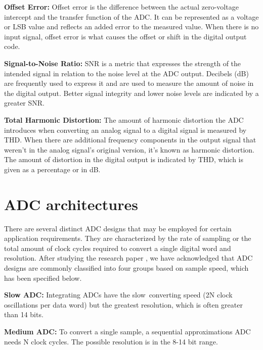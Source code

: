 \vspace{1\baselineskip}\par 
\textbf{Offset Error:} Offset error is the difference between the actual zero-voltage intercept and the transfer function of the ADC. It can be represented as a voltage or LSB value and reflects an added error to the measured value. When there is no input signal, offset error is what causes the offset or shift in the digital output code.

\vspace{1\baselineskip}\par 
\textbf{Signal-to-Noise Ratio:} SNR is a metric that expresses the strength of the intended signal in relation to the noise level at the ADC output. Decibels (dB) are frequently used to express it and are used to measure the amount of noise in the digital output. Better signal integrity and lower noise levels are indicated by a greater SNR.

\vspace{1\baselineskip}\par 
\textbf{Total Harmonic Distortion:} The amount of harmonic distortion the ADC introduces when converting an analog signal to a digital signal is measured by THD. When there are additional frequency components in the output signal that weren't in the analog signal's original version, it's known as harmonic distortion. The amount of distortion in the digital output is indicated by THD, which is given as a percentage or in dB.


\section{ADC architectures}
There are several distinct ADC designs that may be employed for certain application requirements. They are characterized by the rate of sampling or the total amount of clock cycles required to convert a single digital word and resolution. After studying the research paper \cite{KozminPhD}, we have acknowledged that ADC designs are commonly classified into four groups based on sample speed, which has been specified below.
\vspace{1\baselineskip}\par 
\textbf{Slow ADC:} Integrating ADCs have the slow converting speed (2N clock oscillations per data word) but the greatest resolution, which is often greater than 14 bits.\par

\textbf{Medium ADC:} To convert a single sample, a sequential approximations ADC needs N clock cycles. The possible resolution is in the 8-14 bit range.
\par

